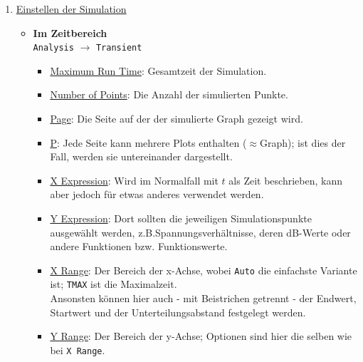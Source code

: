 \begin{enumerate}
    \item \underline{Einstellen der Simulation} \\
    \begin{itemize}
        \item \textbf{Im Zeitbereich} \\
        \verb|Analysis| $\rightarrow$ \verb|Transient|
        \begin{itemize}
            \item \underline{Maximum Run Time}: Gesamtzeit der Simulation.
            \item \underline{Number of Points}: Die Anzahl der simulierten Punkte.
            \item \underline{Page}: Die Seite auf der der simulierte Graph gezeigt wird.
            \item \underline{P}: Jede Seite kann mehrere Plots enthalten ($\approx$Graph); ist dies der Fall, werden sie untereinander dargestellt.
            \item \underline{X Expression}: Wird im Normalfall mit $t$ als Zeit beschrieben, kann aber jedoch für etwas anderes verwendet werden.
            \item \underline{Y Expression}: Dort sollten die jeweiligen Simulationspunkte ausgewählt werden, z.B.Spannungsverhältnisse, deren dB-Werte oder andere Funktionen bzw. Funktionswerte.
            \item \underline{X Range}: Der Bereich der x-Achse, wobei \verb|Auto| die einfachste Variante ist; \verb|TMAX| ist die Maximalzeit.\\
            Ansonsten können hier auch - mit Beistrichen getrennt - der Endwert, Startwert und der Unterteilungsabstand festgelegt werden.
            \item \underline{Y Range}: Der Bereich der y-Achse; Optionen sind hier die selben wie bei \verb|X Range|.
        \end{itemize}

    \end{itemize}
\end{enumerate}
